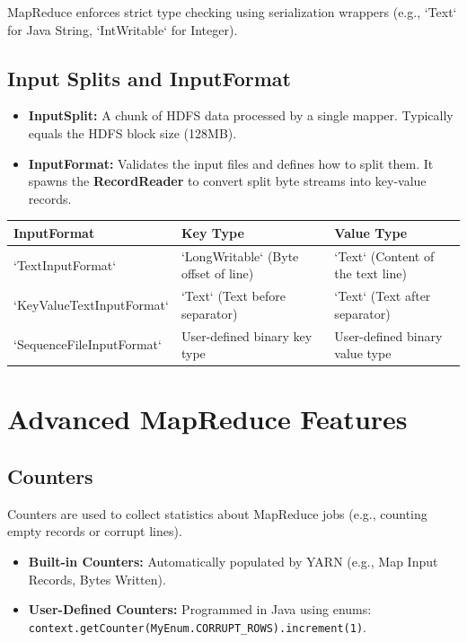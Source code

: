 \documentclass[12pt,a4paper]{article}
\renewcommand{\arraystretch}{1.45}
\begin{document}
MapReduce enforces strict type checking using serialization wrappers (e.g., `Text` for Java String, `IntWritable` for Integer).

\subsection{Input Splits and InputFormat}
\begin{itemize}[leftmargin=*, itemsep=3pt]
  \item \textbf{InputSplit:} A chunk of HDFS data processed by a single mapper. Typically equals the HDFS block size (128MB).
  \item \textbf{InputFormat:} Validates the input files and defines how to split them. It spawns the \textbf{RecordReader} to convert split byte streams into key-value records.
\end{itemize}

\par\vspace{6pt}\noindent
{\renewcommand{\arraystretch}{1.4}%
\begin{tabularx}{\linewidth}{|B{3.2cm}|Y|Y|}
\hline
\textbf{InputFormat} & \textbf{Key Type} & \textbf{Value Type} \\
\hline
`TextInputFormat` & `LongWritable` (Byte offset of line) & `Text` (Content of the text line) \\
\hline
`KeyValueTextInputFormat` & `Text` (Text before separator) & `Text` (Text after separator) \\
\hline
`SequenceFileInputFormat` & User-defined binary key type & User-defined binary value type \\
\hline
\end{tabularx}}

\section{Advanced MapReduce Features}

\subsection{Counters}
Counters are used to collect statistics about MapReduce jobs (e.g., counting empty records or corrupt lines).
\begin{itemize}[leftmargin=*, itemsep=3pt]
  \item \textbf{Built-in Counters:} Automatically populated by YARN (e.g., Map Input Records, Bytes Written).
  \item \textbf{User-Defined Counters:} Programmed in Java using enums: \texttt{context.getCounter(MyEnum.CORRUPT\_ROWS).increment(1)}.
\end{itemize}
\end{document}
